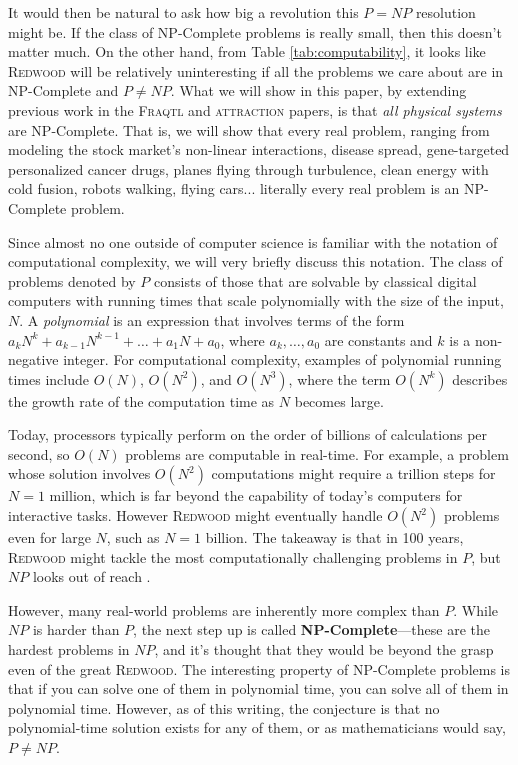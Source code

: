 \documentclass{report}
\begin{document}
It would then be natural to ask how big a revolution this \(P = NP\) resolution might be. If the class of NP-Complete problems is really small, then this doesn't matter much. On the other hand, from Table \ref{tab:computability}, it looks like \textsc{Redwood} will be relatively uninteresting if all the problems we care about are in NP-Complete and \(P \neq NP\). What we will show in this paper, by extending previous work in the \textsc{Fraqtl} \cite{FRAQTL2024} and \textsc{attraction} \cite{AbadirAttraction2024} papers, is that \textit{all physical systems} are NP-Complete. That is, we will show that every real problem, ranging from modeling the stock market's non-linear interactions, disease spread, gene-targeted personalized cancer drugs, planes flying through turbulence, clean energy with cold fusion, robots walking, flying cars... literally every real problem is an NP-Complete problem.

Since almost no one outside of computer science is familiar with the notation of computational complexity, we will very briefly discuss this notation. The class of problems denoted by \(P\) consists of those that are solvable by classical digital computers with running times that scale polynomially with the size of the input, \(N\). A \textit{polynomial} is an expression that involves terms of the form \(a_k N^k + a_{k-1} N^{k-1} + \dots + a_1 N + a_0\), where \(a_k, \dots, a_0\) are constants and \(k\) is a non-negative integer. For computational complexity, examples of polynomial running times include \(O(N)\), \(O(N^2)\), and \(O(N^3)\), where the term \(O(N^k)\) describes the growth rate of the computation time as \(N\) becomes large.

Today, processors typically perform on the order of billions of calculations per second, so \(O(N)\) problems are computable in real-time. For example, a problem whose solution involves \(O(N^2)\) computations might require a trillion steps for \(N = 1\) million, which is far beyond the capability of today's computers for interactive tasks. However \textsc{Redwood} might eventually handle \(O(N^2)\) problems even for large \(N\), such as \(N = 1\) billion. The takeaway is that in 100 years, \textsc{Redwood} might tackle the most computationally challenging problems in \(P\), but \(NP\) looks out of reach \cite{Bennett1997}\cite{Grover1996}.


However, many real-world problems are inherently more complex than \(P\). While \(NP\) is harder than \(P\), the next step up is called \textbf{NP-Complete}—these are the hardest problems in \(NP\), and it's thought that they would be beyond the grasp even of the great \textsc{Redwood}. The interesting property of NP-Complete problems is that if you can solve one of them in polynomial time, you can solve all of them in polynomial time. However, as of this writing, the conjecture is that no polynomial-time solution exists for any of them, or as mathematicians would say, \(P \neq NP\).
\end{document}
